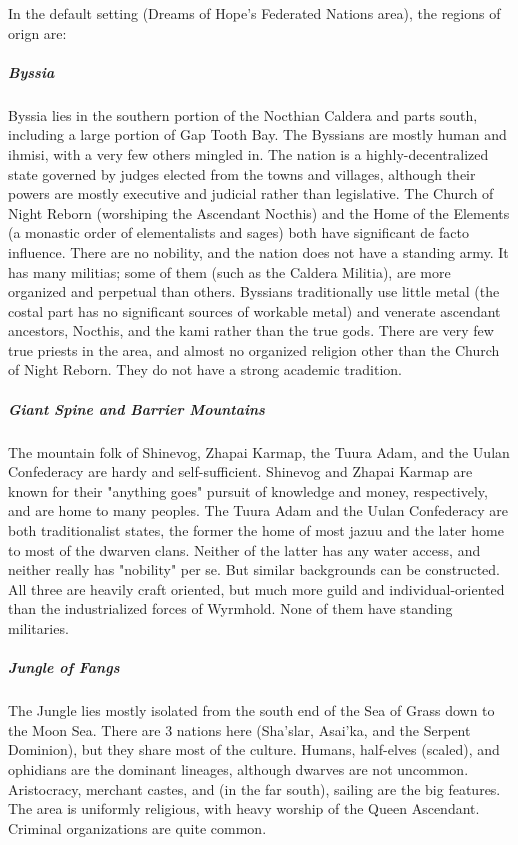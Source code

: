 \documentclass[draft]{article}
\begin{document}
In the default setting (Dreams of Hope's Federated Nations area), the regions of orign are:

\subparagraph*{Byssia}
Byssia lies in the southern portion of the Nocthian Caldera and parts south, including a large portion of Gap Tooth Bay. The Byssians are mostly human and ihmisi, with a very few others mingled in. The nation is a highly-decentralized state governed by judges elected from the towns and villages, although their powers are mostly executive and judicial rather than legislative. The Church of Night Reborn (worshiping the Ascendant Nocthis) and the Home of the Elements (a monastic order of elementalists and sages) both have significant de facto influence. There are no nobility, and the nation does not have a standing army. It has many militias; some of them (such as the Caldera Militia), are more organized and perpetual than others. Byssians traditionally use little metal (the costal part has no significant sources of workable metal) and venerate ascendant ancestors, Nocthis, and the kami rather than the true gods. There are very few true priests in the area, and almost no organized religion other than the Church of Night Reborn. They do not have a strong academic tradition.

\subparagraph*{Giant Spine and Barrier Mountains}
The mountain folk of Shinevog, Zhapai Karmap, the Tuura Adam, and the Uulan Confederacy are hardy and self-sufficient. Shinevog and Zhapai Karmap are known for their "anything goes" pursuit of knowledge and money, respectively, and are home to many peoples. The Tuura Adam and the Uulan Confederacy are both traditionalist states, the former the home of most jazuu and the later home to most of the dwarven clans. Neither of the latter has any water access, and neither really has "nobility" per se. But similar backgrounds can be constructed. All three are heavily craft oriented, but much more guild and individual-oriented than the industrialized forces of Wyrmhold. None of them have standing militaries.

\subparagraph*{Jungle of Fangs}
The Jungle lies mostly isolated from the south end of the Sea of Grass down to the Moon Sea. There are 3 nations here (Sha'slar, Asai'ka, and the Serpent Dominion), but they share most of the culture. Humans, half-elves (scaled), and ophidians are the dominant lineages, although dwarves are not uncommon. Aristocracy, merchant castes, and (in the far south), sailing are the big features. The area is uniformly religious, with heavy worship of the Queen Ascendant. Criminal organizations are quite common.
\end{document}
